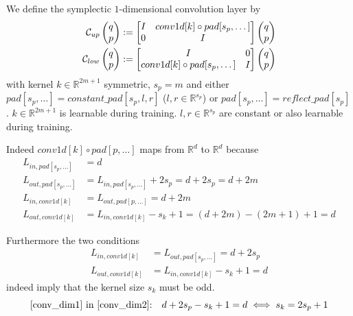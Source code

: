 \documentclass[twoside,a4paper]{article}
\begin{document}


We define the symplectic $1$-dimensional convolution layer by
\begin{align*}
	\mathcal{C}_{up} \begin{pmatrix} q \\ p \end{pmatrix} &:= \begin{bmatrix} I & {conv1d[k] \circ pad[s_p,\dots]} \\ 0 & I \end{bmatrix} \begin{pmatrix} q \\ p \end{pmatrix} \\
	\mathcal{C}_{low} \begin{pmatrix} q \\ p \end{pmatrix} &:= \begin{bmatrix} I & 0 \\ {conv1d[k] \circ pad[s_p,\dots]} & I \end{bmatrix} \begin{pmatrix} q \\ p \end{pmatrix}
\end{align*}
with kernel $k \in \mathbb{R}^{2m+1}$ symmetric, $s_p = m$
and either $pad[s_p,\dots] = constant\_pad[s_p,l,r]$ ($l,r \in \mathbb{R}^{s_p}$) 
or $pad[s_p,\dots] = reflect\_pad[s_p]$. $k \in \mathbb{R}^{2m+1}$ is learnable during training. 
$l,r \in \mathbb{R}^{s_p}$ are constant or also learnable during training.

Indeed $conv1d[k] \circ pad[p,\dots]$ maps from $\mathbb{R}^d$ to $\mathbb{R}^d$ because
\begin{align*}
	L_{in,pad[s_p,\dots]} &= d \\
	L_{out,pad[s_p,\dots]} &= L_{in,pad[s_p,\dots]} + 2s_p = d+2s_p = d+2m \\
	L_{in,conv1d[k]} &= L_{out,pad[p,\dots]} = d+2m \\
	L_{out,conv1d[k]} &= L_{in,conv1d[k]} - s_k + 1 = (d+2m) - (2m+1) + 1 = d
\end{align*}

Furthermore the two conditions
\begin{align}
	L_{in,conv1d[k]} &= L_{out,pad[s_p,\dots]} = d+2s_p \label{conv_dim1} \\ 
	L_{out,conv1d[k]} &= L_{in,conv1d[k]} - s_k + 1 = d \label{conv_dim2}
\end{align}
indeed imply that the kernel size $s_k$ must be odd.
\begin{equation*}
	\text{\cref{conv_dim1} in \cref{conv_dim2}:} \quad d+2s_p - s_k + 1 = d \iff s_k = 2s_p+1
\end{equation*}
\end{document}
